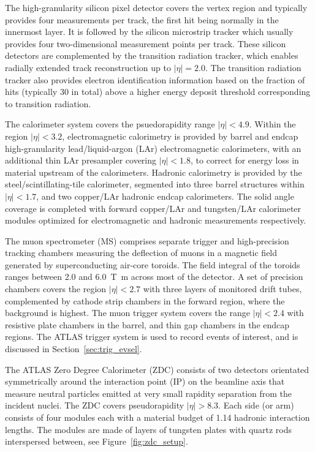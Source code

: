 \documentclass[NOTE, atlasdraft=true, texlive=2020, UKenglish]{atlasdoc}
\begin{document}
The high-granularity silicon pixel detector covers the vertex region and typically provides four measurements per track, the first hit being normally in the innermost layer. It is followed by the silicon microstrip tracker which usually provides four two-dimensional measurement points per track. These silicon detectors are complemented by the transition radiation tracker, which enables radially extended track reconstruction up to $|\eta|=2.0$. The transition radiation tracker also provides electron identification information based on the fraction of hits (typically 30 in total) above a higher energy deposit threshold corresponding to transition radiation.

 The calorimeter system covers the psuedorapidity range $|\eta|<4.9$. Within the region $|\eta|<3.2$, electromagnetic calorimetry is provided by barrel and endcap high-granularity lead/liquid-argon (LAr) electromagnetic calorimeters, with an additional thin LAr presampler covering $|\eta|<1.8$, to correct for energy loss in material upstream of the calorimeters. Hadronic calorimetry is provided by the steel/scintillating-tile calorimeter, segmented into three barrel structures within $|\eta|<1.7$, and two copper/LAr hadronic endcap calorimeters. The solid angle coverage is completed with forward copper/LAr and tungsten/LAr calorimeter modules optimized for electromagnetic and hadronic measurements respectively.

  
 The muon spectrometer (MS) comprises separate trigger and high-precision tracking chambers measuring the deflection of muons in a magnetic field generated by superconducting air-core toroids. The field integral of the toroids ranges between 2.0 and 6.0~T~m across most of the detector. A set of precision chambers covers the region $|\eta|<2.7$ with three layers of monitored drift tubes, complemented by cathode strip chambers in the forward region, where the background is highest. The muon trigger system covers the range $|\eta|<2.4$ with resistive plate chambers in the barrel, and thin gap chambers in the endcap regions. 
The ATLAS trigger system is used to record events of interest, and is discussed in Section~\ref{sec:trig_evsel}.

The ATLAS Zero Degree Calorimeter (ZDC) consists of two detectors orientated symmetrically around the interaction point (IP) on the beamline axis that measure neutral particles emitted at very small rapidity separation from the incident nuclei. The ZDC covers pseudorapidity  $|\eta|>8.3$.  Each side (or arm) consists of four modules each with a material budget of 1.14 hadronic interaction lengths.  The modules are made of layers of tungsten plates with quartz rods interspersed between, see Figure~\ref{fig:zdc_setup}.
\end{document}
